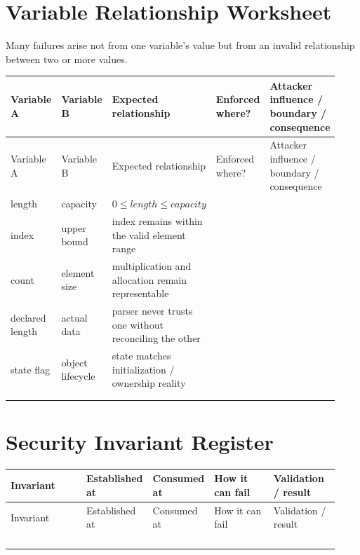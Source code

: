 \documentclass[10pt]{article}
\begin{document}
\section{Variable Relationship Worksheet}
Many failures arise not from one variable's value but from an invalid relationship between two or more values.
\begin{longtable}{@{}L{0.14\linewidth}L{0.14\linewidth}L{0.23\linewidth}L{0.18\linewidth}L{0.24\linewidth}@{}}
\toprule
Variable A & Variable B & Expected relationship & Enforced where? & Attacker influence / boundary / consequence \\
\midrule
\endfirsthead
\toprule
Variable A & Variable B & Expected relationship & Enforced where? & Attacker influence / boundary / consequence \\
\midrule
\endhead
length & capacity & $0 \leq length \leq capacity$ & & \\
index & upper bound & index remains within the valid element range & & \\
count & element size & multiplication and allocation remain representable & & \\
declared length & actual data & parser never trusts one without reconciling the other & & \\
state flag & object lifecycle & state matches initialization / ownership reality & & \\
\rule{0pt}{2.5em} & & & & \\
\rule{0pt}{2.5em} & & & & \\
\bottomrule
\end{longtable}
\clearpage

\section{Security Invariant Register}
\begin{longtable}{@{}L{0.23\linewidth}L{0.16\linewidth}L{0.16\linewidth}L{0.18\linewidth}L{0.20\linewidth}@{}}
\toprule
Invariant & Established at & Consumed at & How it can fail & Validation / result \\
\midrule
\endfirsthead
\toprule
Invariant & Established at & Consumed at & How it can fail & Validation / result \\
\midrule
\endhead
\rule{0pt}{2.6em} & & & & \\
\rule{0pt}{2.6em} & & & & \\
\rule{0pt}{2.6em} & & & & \\
\rule{0pt}{2.6em} & & & & \\
\bottomrule
\end{longtable}
\end{document}
